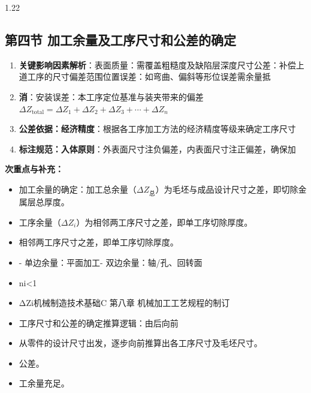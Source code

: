 \documentclass[12pt,a4paper]{article}
\begin{document}
\begin{spacing}{1.22}
\subsection{第四节 加工余量及工序尺寸和公差的确定}
\begin{tcolorbox}[colback=yellow!6,colframe=red!55!black,title=重点,left=1mm,right=1mm]
\begin{enumerate}[leftmargin=2.2em,label=\arabic*.]
  \item \textbf{关键影响因素解析}：表面质量：需覆盖粗糙度及缺陷层深度尺寸公差：补偿上道工序的尺寸偏差范围位置误差：如弯曲、偏斜等形位误差需余量抵
  \item \textbf{消}：安装误差：本工序定位基准与装夹带来的偏差$\Delta Z_{\text{total}}=\Delta Z_1+\Delta Z_2+\Delta Z_3+\cdots+\Delta Z_n$
  \item \textbf{公差依据：经济精度}：根据各工序加工方法的经济精度等级来确定工序尺寸
  \item \textbf{标注规范：入体原则}：外表面尺寸注负偏差，内表面尺寸注正偏差，确保加
\end{enumerate}
\end{tcolorbox}
\noindent\textbf{次重点与补充：}
\begin{itemize}[leftmargin=2.2em,label=--]
  \item 加工余量的确定：加工总余量（$\Delta Z_{\text{总}}$）为毛坯与成品设计尺寸之差，即切除金属层总厚度。
  \item 工序余量（$\Delta Z_i$）为相邻两工序尺寸之差，即单工序切除厚度。
  \item 相邻两工序尺寸之差，即单工序切除厚度。
  \item - 单边余量：平面加工- 双边余量：轴/孔、回转面
  \item ni<1
  \item ΔZi机械制造技术基础C 第八章 机械加工工艺规程的制订
  \item 工序尺寸和公差的确定推算逻辑：由后向前
  \item 从零件的设计尺寸出发，逐步向前推算出各工序尺寸及毛坯尺寸。
  \item 公差。
  \item 工余量充足。
\end{itemize}


\end{spacing}
\end{document}
